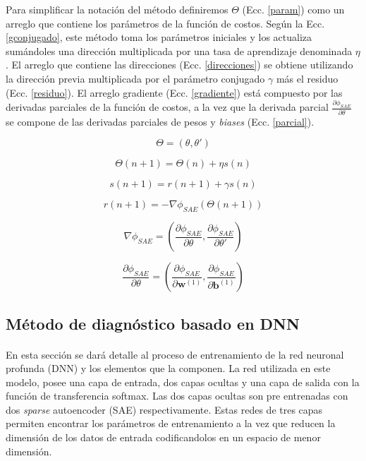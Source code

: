 \documentclass[12pt]{article}%
\begin{document}
Para simplificar la notación del método definiremos $\Theta$ (Ecc. \ref{param}) como un arreglo que contiene los parámetros de la función de costos. Según la Ecc. \ref{gconjugado}, este método toma los parámetros iniciales y los actualiza sumándoles una dirección multiplicada por una tasa de aprendizaje denominada $\eta$. El arreglo que contiene las direcciones (Ecc. \ref{direcciones}) se obtiene utilizando la dirección previa multiplicada por el parámetro conjugado $\gamma$ más el residuo (Ecc. \ref{residuo}). El arreglo gradiente (Ecc. \ref{gradiente}) está compuesto por las derivadas parciales de la función de costos, a la vez que la derivada parcial $\frac{\partial{\phi_{SAE}}}{\partial{\theta}}$ se compone de las derivadas parciales de pesos y \textit{biases} (Ecc. \ref{parcial}).

\begin{equation}
\label{param}
\Theta = (\theta,\theta')
\end{equation} 

\begin{equation}
\label{gconjugado}
\Theta(n+1)=\Theta(n)+{\eta}s(n)
\end{equation}

\begin{equation}
\label{direcciones}
s(n+1)=r(n+1)+\gamma{s(n)}
\end{equation} 

\begin{equation}
\label{residuo}
r(n+1) = -\nabla{\phi_{SAE}(\Theta(n+1))}
\end{equation} 

\begin{equation}
\label{gradiente}
\nabla{\phi_{SAE}} = \left(\frac{\partial{\phi_{SAE}}}{\partial{\theta}},\frac{\partial{\phi_{SAE}}}{\partial{\theta'}}\right)
\end{equation}

\begin{equation}
\label{parcial}
\frac{\partial{\phi_{SAE}}}{\partial{\theta}} = \left(\frac{\partial{\phi_{SAE}}}{\partial{\textbf{w}^{(1)}}},\frac{\partial{\phi_{SAE}}}{\partial{\textbf{b}^{(1)}}}\right)
\end{equation}  
\subsection{Método de diagnóstico basado en DNN}
\label{sec:training}

\paragraph{}
En esta sección se dará detalle al proceso de entrenamiento de la red neuronal profunda (DNN) y los elementos que la componen. La red utilizada en este modelo, posee una capa de entrada, dos capas ocultas y una capa de salida con la función de transferencia softmax. Las dos capas ocultas son pre entrenadas con dos \textit{sparse} autoencoder (SAE) respectivamente. Estas redes de tres capas permiten encontrar los parámetros de entrenamiento a la vez que reducen la dimensión de los datos de entrada codificandolos en un espacio de menor dimensión. 
\end{document}
